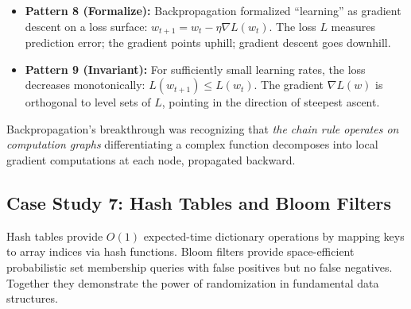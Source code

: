 \begin{itemize}
\item \textbf{Pattern 8 (Formalize):} Backpropagation formalized ``learning'' as gradient descent on a loss surface: $w_{t+1} = w_t - \eta \nabla L(w_t)$. The loss $L$ measures prediction error; the gradient points uphill; gradient descent goes downhill.

\item \textbf{Pattern 9 (Invariant):} For sufficiently small learning rates, the loss decreases monotonically: $L(w_{t+1}) \le L(w_t)$. The gradient $\nabla L(w)$ is orthogonal to level sets of $L$, pointing in the direction of steepest ascent.
\end{itemize}

Backpropagation's breakthrough was recognizing that \emph{the chain rule operates on computation graphs} differentiating a complex function decomposes into local gradient computations at each node, propagated backward.

\subsection{Case Study 7: Hash Tables and Bloom Filters}

Hash tables provide $O(1)$ expected-time dictionary operations by mapping keys to array indices via hash functions. Bloom filters provide space-efficient probabilistic set membership queries with false positives but no false negatives. Together they demonstrate the power of randomization in fundamental data structures.

